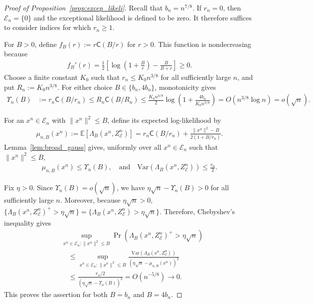 \documentclass[11pt,onecolumn]{IEEEtran}
\newcommand{\calE}{\mathcal{E}}
\newcommand{\rvC}{\mathsf{C}}
\begin{document}
\begin{proof}[Proof of Proposition~\ref{prop:excep_likeli}]
Recall that $b_n=n^{7/8}$. If $r_n=0$, then $\calE_n=\{0\}$ and the
exceptional likelihood is defined to be zero. It therefore suffices to
consider indices for which $r_n\ge1$.

For $B>0$, define $f_B(r):=r\rvC(B/r)$ for $ r>0$.
This function is nondecreasing because
\begin{align}
f_B'(r)
=\frac12\left[
\log\left(1+\frac Br\right)-\frac{B}{B+r}
\right]\ge0.
\end{align}
Choose a finite constant $K_0$ such that
$r_n\le K_0n^{3/8}$ for all sufficiently large $n$, and put $R_n:=K_0n^{3/8}$.
For either choice $B\in\{b_n,4b_n\}$, monotonicity gives
\begin{align}
\Upsilon_n(B)
&:=r_n\rvC(B/r_n)\le R_n\rvC(B/R_n)
\le
\frac{K_0n^{3/8}}{2}
\log\left(1+\frac{4b_n}{K_0n^{3/8}}\right)=O(n^{3/8}\log n)
=o(\sqrt n).
\label{eqn:broad-cost}
\end{align}

For an   $x^n\in\calE_n$ with $\|x^n\|^2\le B$, define its expected log-likelihood by
\begin{align}
\mu_{n,B}(x^n)
:=\mathbb E[\Lambda_B(x^n,Z_{\calE}^n)]=
r_n\rvC(B/r_n)
+\frac{\|x^n\|^2-B}{2(1+B/r_n)}.
\end{align}
Lemma~\ref{lem:broad_gauss} gives, uniformly over all $x^n\in\calE_n $ such that $\|x^n\|^2\le B$,
\begin{align}
\mu_{n,B}(x^n)\le \Upsilon_n(B),
\quad\mbox{and}\quad
\mathrm{Var}(\Lambda_B(x^n,Z_{\calE}^n))\le\frac{r_n}{2}.
\end{align}

Fix $\eta>0$. Since $\Upsilon_n(B)=o(\sqrt n)$, we have
$\eta\sqrt n-\Upsilon_n(B)>0$ for all sufficiently large $n$. Moreover,
because $\eta\sqrt n>0$, $ 
\{\Lambda_B(x^n,Z_{\calE}^n)^+>\eta\sqrt n\}
=
\{\Lambda_B(x^n,Z_{\calE}^n)>\eta\sqrt n\}.
$ 
Therefore, Chebyshev's inequality gives
\begin{align}
&\sup_{x^n\in\calE_n: \|x^n\|^2\le B}
\Pr\left(
\Lambda_B(x^n,Z_{\calE}^n)^+>\eta\sqrt n
\right)
\nonumber\\
&\quad\le
\sup_{x^n\in\calE_n: \|x^n\|^2\le B}
\frac{\mathrm{Var}(\Lambda_B(x^n,Z_{\calE}^n))}
     {(\eta\sqrt n-\mu_{n,B}(x^n))^2}
\nonumber\\
&\quad\le
\frac{r_n/2}{(\eta\sqrt n-\Upsilon_n(B))^2}
=O(n^{-5/8}) \to0.
\end{align}
This proves the assertion for both $B=b_n$ and $B=4b_n$.
\end{proof}
\end{document}
